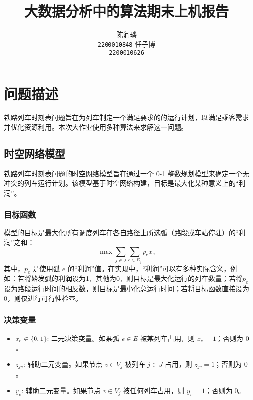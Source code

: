 \documentclass{article}
\title{大数据分析中的算法期末上机报告}
\author{
    \large 陈润璘 \\
    \large \texttt{2200010848}
    \And
    \large 任子博 \\
    \large \texttt{2200010626}
}
\begin{document}
\maketitle

\section{问题描述}
铁路列车时刻表问题旨在为列车制定一个满足要求的的运行计划，以满足乘客需求并优化资源利用。本次大作业使用多种算法来求解这一问题。

\subsection{时空网络模型}\label{subsec:spatial-temporal-network-model}

铁路列车时刻表问题的时空网络模型旨在通过一个 0-1 整数规划模型来确定一个无冲突的列车运行计划。该模型基于时空网络构建，目标是最大化某种意义上的“利润”。

\subsubsection{目标函数}
模型的目标是最大化所有调度列车在各自路径上所选弧（路段或车站停驻）的“利润”之和：
\begin{equation}
    \max \sum_{j \in J} \sum_{e \in E_j} p_e x_e\label{eq:obj}
\end{equation}
其中，$p_e$ 是使用弧 $e$
的“利润”值。在实现中，“利润”可以有多种实际含义，例如：若将始发弧的利润设为1，其他为0，则目标是最大化运行的列车数量；若将$p_e$设为路段运行时间的相反数，则目标是最小化总运行时间；若将目标函数直接设为0，则仅进行可行性检查。

\subsubsection{决策变量}
\begin{itemize}
    \item $x_e \in \{0,1\}$: 二元决策变量。如果弧 $e \in E$ 被某列车占用，则 $x_e = 1$；否则为 $0$。
    \item $z_{jv}$: 辅助二元变量。如果节点 $v \in V_j$ 被列车 $j \in J$ 占用，则
        $z_{jv} = 1$；否则为 $0$。
    \item $y_v$: 辅助二元变量。如果节点 $v \in V_j$ 被任何列车占用，则 $y_v = 1$；否则为 $0$。
\end{itemize}
\end{document}
